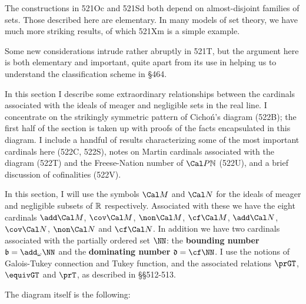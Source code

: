 {The constructions in 521Oc and 521Sd both depend on almost-disjoint
families of sets.   Those described here are elementary.   In many
models of set theory, we have much more striking results, of which
521Xm is a simple example.

Some new considerations intrude rather abruptly
in 521T, but the argument here is both elementary and important, quite
apart from its use in helping us to understand the classification
scheme in \S464.
}%

\discrpage


\def\chaptername{Cardinal functions of measure theory}
\def\sectionname{Cicho\'n's diagram}

\def\finint{\text{\tt finint}}
\def\disj{\text{\tt disj}}


In this section I describe some extraordinary relationships between the
cardinals associated with the ideals of meager and negligible sets in
the real line.   I concentrate on the strikingly symmetric pattern of
Cicho\'n's diagram (522B);  the first half
of the section is taken up with proofs
of the facts encapsulated in this diagram.   I include a handful of
results characterizing some of the most important cardinals here (522C,
522S), notes on Martin cardinals associated with the diagram
(522T) and the Freese-Nation number of $\Cal P\Bbb N$ (522U), and a
brief discussion of cofinalities (522V).

 In this section, I will use the symbols $\Cal M$
and $\Cal N$ for the ideals of meager and negligible subsets of
$\Bbb R$ respectively.   Associated with these we have the eight
cardinals $\add\Cal M$,
$\cov\Cal M$, $\non\Cal M$, $\cf\Cal M$, $\add\Cal N$, $\cov\Cal N$,
$\non\Cal N$ and $\cf\Cal N$.   In addition we have two
cardinals associated with the partially ordered set $\NN$:  the {\bf
bounding number} $\frak b=\add_{\omega}\NN$ and the {\bf dominating number}
$\frak d=\cf\NN$.
I use the notions of Galois-Tukey connection and Tukey function, and the
associated relations $\prGT$, $\equivGT$ and $\prT$, as described in
\S\S512-513.

 The diagram itself is the following:

